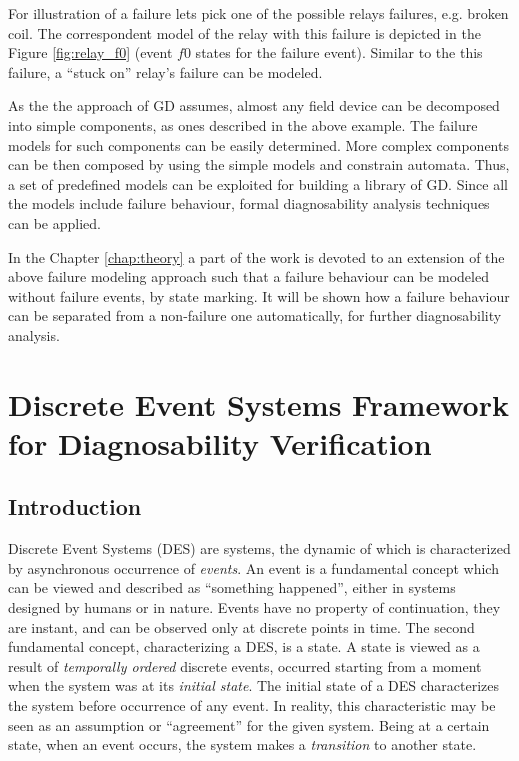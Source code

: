 For illustration of a failure lets pick one of the possible relays failures,
e.g. broken coil. The correspondent model of the relay with this failure is
depicted in the Figure \ref{fig:relay_f0} (event $f0$ states for the failure
event). Similar to the this failure, a ``stuck on'' relay's failure can be
modeled.

As the the approach of GD assumes, almost any field device can be decomposed
into simple components, as ones described in the above example. The failure
models for such components can be easily determined. More complex components can
be then composed by using the simple models and constrain automata. Thus, a
set of predefined models can be exploited for building a library of GD. Since
all the models include failure behaviour, formal diagnosability analysis
techniques can be applied.

In the Chapter \ref{chap:theory} a part of the work is devoted to an extension
of the above failure modeling approach such that a failure behaviour can be
modeled without failure events, by state marking. It will be shown how a failure
behaviour can be separated from a non-failure one automatically, for further
diagnosability analysis.
 

\section{Discrete Event Systems Framework for Diagnosability Verification}

\subsection{Introduction}

Discrete Event Systems (DES) are systems, the dynamic of which is characterized
by asynchronous occurrence of \emph{events}. An event is a fundamental concept
which can be viewed and described as ``something happened'', either in systems
designed by humans or in nature. Events have no property of continuation, they
are instant, and can be observed only at discrete points in time. The second
fundamental concept, characterizing a DES, is a state. A state is viewed as a
result of \emph{temporally ordered} discrete events, occurred starting from a
moment when the system was at its \emph{initial state}. The initial state of a
DES characterizes the system before occurrence of any event. In reality, this
characteristic may be seen as an assumption or ``agreement'' for the given
system. Being at a certain state, when an event occurs, the system makes a
\emph{transition} to another state.

